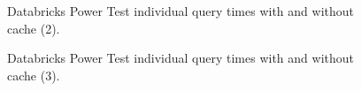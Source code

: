 \begin{figure}
   \begin{center}
   \end{center}
   \caption{Databricks Power Test individual query times with and without cache (2).}
   \label{fig:additionalResultsDatabricksNoCachePowerTestIndividualQueries2}
\end{figure}

\begin{figure}
   \begin{center}
   \end{center}
   \caption{Databricks Power Test individual query times with and without cache (3).}
   \label{fig:additionalResultsDatabricksNoCachePowerTestIndividualQueries3}
\end{figure}

